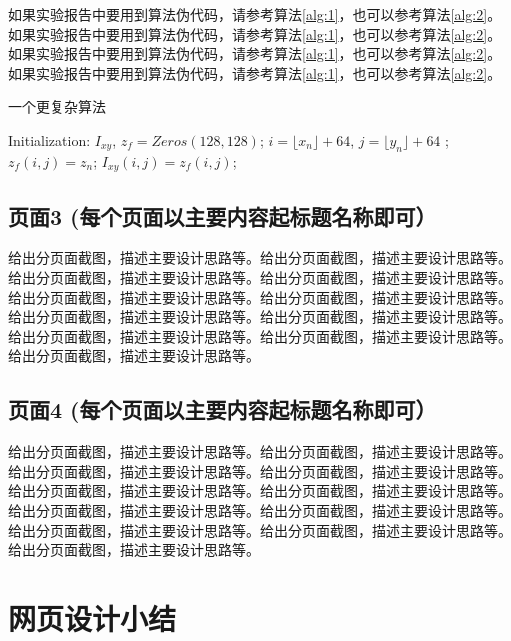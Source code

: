 \documentclass[supercite]{Experimental_Report}
\theoremstyle{definition}
\begin{document}
如果实验报告中要用到算法伪代码，请参考算法\ref{alg:1}，也可以参考算法\ref{alg:2}。如果实验报告中要用到算法伪代码，请参考算法\ref{alg:1}，也可以参考算法\ref{alg:2}。如果实验报告中要用到算法伪代码，请参考算法\ref{alg:1}，也可以参考算法\ref{alg:2}。如果实验报告中要用到算法伪代码，请参考算法\ref{alg:1}，也可以参考算法\ref{alg:2}。

\begin{algorithm}[h] 
	\caption{一个更复杂算法}
	\begin{algorithmic}[1]
		\State Initialization: $I_{xy}$, $z_{f}=Zeros(128, 128)$; 
		\State $i=\lfloor x_n \rfloor+64$, $j=\lfloor y_n \rfloor + 64$
		;
		\State $z_{f}(i,j)=z_n$;
		\EndIf
		\State $I_{xy}(i,j)=z_{f}(i,j)$;
		\EndFor 
	\end{algorithmic}\label{alg:2}
\end{algorithm}

\subsection{页面3 (每个页面以主要内容起标题名称即可）}

给出分页面截图，描述主要设计思路等。给出分页面截图，描述主要设计思路等。给出分页面截图，描述主要设计思路等。给出分页面截图，描述主要设计思路等。给出分页面截图，描述主要设计思路等。给出分页面截图，描述主要设计思路等。给出分页面截图，描述主要设计思路等。给出分页面截图，描述主要设计思路等。给出分页面截图，描述主要设计思路等。给出分页面截图，描述主要设计思路等。给出分页面截图，描述主要设计思路等。

\subsection{页面4 (每个页面以主要内容起标题名称即可）}

给出分页面截图，描述主要设计思路等。给出分页面截图，描述主要设计思路等。给出分页面截图，描述主要设计思路等。给出分页面截图，描述主要设计思路等。给出分页面截图，描述主要设计思路等。给出分页面截图，描述主要设计思路等。给出分页面截图，描述主要设计思路等。给出分页面截图，描述主要设计思路等。给出分页面截图，描述主要设计思路等。给出分页面截图，描述主要设计思路等。给出分页面截图，描述主要设计思路等。

\newpage

\section{网页设计小结}
\end{document}
